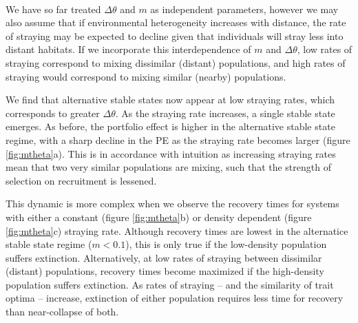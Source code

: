 \documentclass[twocolumn,preprintnumbers,amsmath,amssymb,superscriptaddress]{revtex4}
\begin{document}

\\ 
\noindent We have so far treated $\Delta\theta$ and $m$ as independent parameters, however we may also assume that if environmental heterogeneity increases with distance, the rate of straying may be expected to decline given that individuals will stray less into distant habitats. %
If we incorporate this interdependence of $m$ and $\Delta\theta$, low rates of straying correspond to mixing dissimilar (distant) populations, and high rates of straying would correspond to mixing similar (nearby) populations.

We find that alternative stable states now appear at low straying rates, which corresponds to greater $\Delta\theta$.
As the straying rate increases, a single stable state emerges.
As before, the portfolio effect is higher in the alternative stable state regime, with a sharp decline in the PE as the straying rate becomes larger (figure \ref{fig:mtheta}a).
This is in accordance with intuition as increasing straying rates mean that two very similar populations are mixing, such that the strength of selection on recruitment is lessened.

This dynamic is more complex when we observe the recovery times for systems with either a constant (figure \ref{fig:mtheta}b) or density dependent (figure \ref{fig:mtheta}c) straying rate.
Although recovery times are lowest in the alternatice stable state regime ($m<0.1$), this is only true if the low-density population suffers extinction.
Alternatively, at low rates of straying between dissimilar (distant) populations, recovery times become maximized if the high-density population suffers extinction.
As rates of straying -- and the similarity of trait optima -- increase, extinction of either population requires less time for recovery than near-collapse of both.
\end{document}
